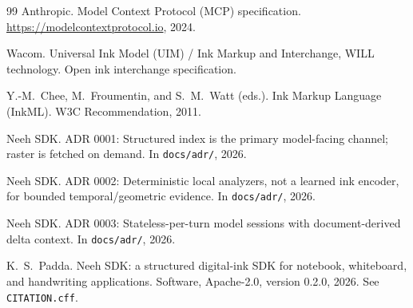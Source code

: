 \documentclass[11pt]{article}
\newcommand{\code}[1]{\texttt{#1}}
\begin{document}
\begin{thebibliography}{99}
Anthropic.
\newblock Model Context Protocol (MCP) specification.
\newblock \url{https://modelcontextprotocol.io}, 2024.

Wacom.
\newblock Universal Ink Model (UIM) / Ink Markup and Interchange, WILL technology.
\newblock Open ink interchange specification.

Y.-M.~Chee, M.~Froumentin, and S.~M.~Watt (eds.).
\newblock Ink Markup Language (InkML).
\newblock W3C Recommendation, 2011.

Neeh SDK.
\newblock ADR 0001: Structured index is the primary model-facing channel; raster is fetched on demand.
\newblock In \code{docs/adr/}, 2026.

Neeh SDK.
\newblock ADR 0002: Deterministic local analyzers, not a learned ink encoder, for bounded temporal/geometric evidence.
\newblock In \code{docs/adr/}, 2026.

Neeh SDK.
\newblock ADR 0003: Stateless-per-turn model sessions with document-derived delta context.
\newblock In \code{docs/adr/}, 2026.

K.~S.~Padda.
\newblock Neeh SDK: a structured digital-ink SDK for notebook, whiteboard, and handwriting applications.
\newblock Software, Apache-2.0, version 0.2.0, 2026. See \code{CITATION.cff}.

\end{thebibliography}
\end{document}
